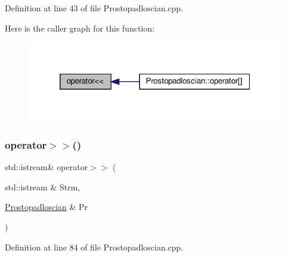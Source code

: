 Definition at line 43 of file Prostopadloscian.\+cpp.

Here is the caller graph for this function\+:\nopagebreak
\begin{figure}[H]
\begin{center}
\leavevmode
\includegraphics[width=319pt]{_prostopadloscian_8hh_a0a77f9bb1cc3f07e11031b947e6e7322_icgraph}
\end{center}
\end{figure}
\mbox{\label{_prostopadloscian_8hh_a002ba87e7198bb0f1a42575278b379d8}} 
\subsubsection{\texorpdfstring{operator$>$$>$()}{operator>>()}}
{\footnotesize\ttfamily std\+::istream\& operator$>$$>$ (\begin{DoxyParamCaption}\item[{std\+::istream \&}]{Strm,  }\item[{\hyperlink{class_prostopadloscian}{Prostopadloscian} \&}]{Pr }\end{DoxyParamCaption})}



Definition at line 84 of file Prostopadloscian.\+cpp.

